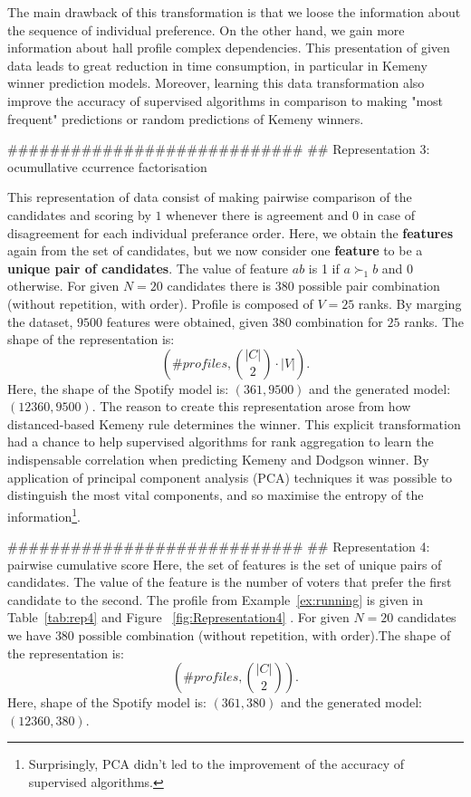 The main drawback of this transformation is that we loose the information about the sequence of individual preference. On the other hand, we gain more information about hall profile complex dependencies. This presentation of given data leads to great reduction in time consumption, in particular in Kemeny winner prediction models. Moreover, learning this data transformation also improve the accuracy of supervised algorithms in comparison to making "most frequent" predictions or random predictions of Kemeny winners.

############################
## Representation 3: ocumullative ccurrence factorisation

This representation of data consist of making pairwise comparison of the candidates and scoring by $1$ whenever there is agreement and $0$ in case of disagreement for each individual preferance order. Here, we obtain the \textbf{features} again from the set of candidates, but we now consider one \textbf{feature} to be a\textbf{ unique pair of candidates}. The value of feature $ab$ is 1 if $a \succ_1 b$ and 0 otherwise. 
For given $N=20$ candidates there is $380$ possible pair combination (without repetition, with order). Profile is composed of $V=25$ ranks. By marging the dataset, $9500$ features were obtained, given $380$ combination for $25$ ranks. 
The shape of the   representation is: $$( \# profiles, \binom{|C|}{2} \cdot |V|).$$ Here, the shape of the Spotify model is: $(361, 9500)$ and the generated model: $(12360, 9500)$.
The reason to create this representation arose from how distanced-based Kemeny rule determines the winner. This explicit transformation had a chance to help supervised algorithms for rank aggregation to learn the indispensable correlation when predicting Kemeny and Dodgson winner. By application of principal component analysis (PCA) techniques it was possible to distinguish the most vital components, and so maximise the entropy of the information\footnote{Surprisingly, PCA  didn't led to the improvement of the accuracy of supervised algorithms.}.

############################
## Representation 4: pairwise cumulative score
Here, the set of features is the set of unique pairs of candidates. The value of the feature is the number of voters that prefer the first candidate to the second. 
The profile from Example~\ref{ex:running} is given in Table~\ref{tab:rep4} and Figure~ \ref{fig:Representation4} .
For given $N=20$ candidates we have  $380$ possible combination (without repetition, with order).The shape of the representation is: $$( \# profiles, \binom{|C|}{2}).$$Here, shape of the Spotify model is: $(361, 380)$ and the generated model: $(12360, 380)$.


